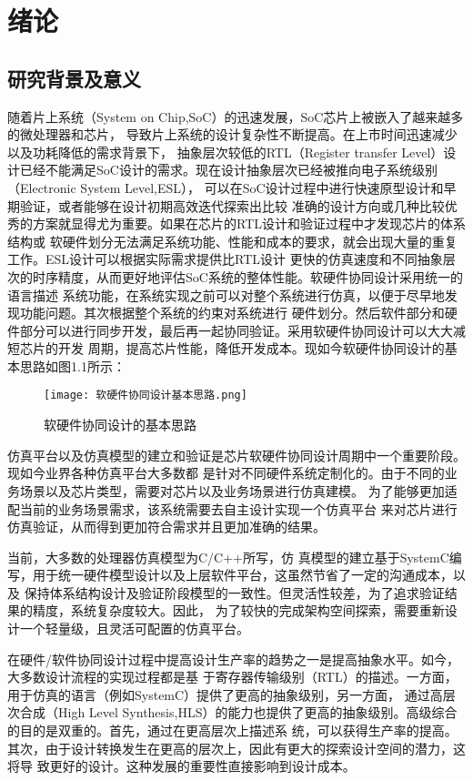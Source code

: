 
\chapter{绪论}

\section{研究背景及意义}
随着片上系统（System on Chip,SoC）的迅速发展，SoC芯片上被嵌入了越来越多的微处理器和芯片，
导致片上系统的设计复杂性不断提高。在上市时间迅速减少以及功耗降低的需求背景下，
抽象层次较低的RTL（Register transfer Level）设计已经不能满足SoC设计的需求。现在设计抽象层次已经被推向电子系统级别（Electronic System Level,ESL），
可以在SoC设计过程中进行快速原型设计和早期验证\cite{1}，或者能够在设计初期高效迭代探索出比较
准确的设计方向或几种比较优秀的方案就显得尤为重要。如果在芯片的RTL设计和验证过程中才发现芯片的体系结构或
软硬件划分无法满足系统功能、性能和成本的要求，就会出现大量的重复工作。ESL设计可以根据实际需求提供比RTL设计
更快的仿真速度和不同抽象层次的时序精度，从而更好地评估SoC系统的整体性能。软硬件协同设计采用统一的语言描述
系统功能，在系统实现之前可以对整个系统进行仿真，以便于尽早地发现功能问题。其次根据整个系统的约束对系统进行
硬件划分。然后软件部分和硬件部分可以进行同步开发，最后再一起协同验证。采用软硬件协同设计可以大大减短芯片的开发
周期，提高芯片性能，降低开发成本。现如今软硬件协同设计的基本思路如图1.1所示：
\begin{figure}
    \centering
    \texttt{[image: 软硬件协同设计基本思路.png]}
    \caption{软硬件协同设计的基本思路}
    \label{fig:badge}
\end{figure}

仿真平台以及仿真模型的建立和验证是芯片软硬件协同设计周期中一个重要阶段。现如今业界各种仿真平台大多数都
是针对不同硬件系统定制化的。由于不同的业务场景以及芯片类型，需要对芯片以及业务场景进行仿真建模。
为了能够更加适配当前的业务场景需求，该系统需要去自主设计实现一个仿真平台
来对芯片进行仿真验证，从而得到更加符合需求并且更加准确的结果。

当前，大多数的处理器仿真模型为C/C++所写，仿
真模型的建立基于SystemC\cite{2}编写，用于统一硬件模型设计以及上层软件平台，这虽然节省了一定的沟通成本，以及
保持体系结构设计及验证阶段模型的一致性。但灵活性较差，为了追求验证结果的精度，系统复杂度较大。因此，
为了较快的完成架构空间探索，需要重新设计一个轻量级，且灵活可配置的仿真平台。

在硬件/软件协同设计过程\cite{3}中提高设计生产率的趋势之一是提高抽象水平。如今，大多数设计流程的实现过程都是基
于寄存器传输级别（RTL）的描述。一方面，用于仿真的语言（例如SystemC）提供了更高的抽象级别，另一方面，
通过高层次合成（High Level Synthesis,HLS）\cite{4}的能力也提供了更高的抽象级别。高级综合的目的是双重的。首先，通过在更高层次上描述系
统，可以获得生产率的提高。其次，由于设计转换发生在更高的层次上，因此有更大的探索设计空间的潜力，这将导
致更好的设计。这种发展的重要性直接影响到设计成本。

